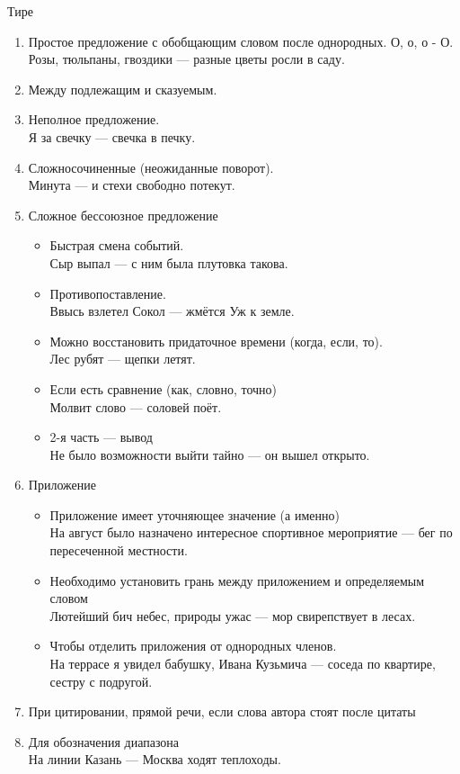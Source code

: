 \documentclass{article}
\begin{document}
Тире

\begin{enumerate}
\item
  Простое предложение с обобщающим словом после однородных. О, о, о - О.\\
  Розы, тюльпаны, гвоздики --- разные цветы росли в саду.
\item
  Между подлежащим и сказуемым.
\item
  Неполное предложение.\\
  Я за свечку --- свечка в печку.
\item
  Сложносочиненные (неожиданные поворот).\\
  Минута --- и стехи свободно потекут.
\item
  Сложное бессоюзное предложение
  \begin{itemize}
  \item
    Быстрая смена событий.\\
    Сыр выпал --- с ним была плутовка такова.
  \item
    Противопоставление.\\
    Ввысь взлетел Сокол --- жмётся Уж к земле.
  \item
    Можно восстановить придаточное времени (когда, если, то).\\
    Лес рубят --- щепки летят.
  \item
    Если есть сравнение (как, словно, точно)\\
    Молвит слово --- соловей поёт.
  \item
    2-я часть --- вывод\\
    Не было возможности выйти тайно --- он вышел открыто.
  \end{itemize}
\item
  Приложение
  \begin{itemize}
  \item
    Приложение имеет уточняющее значение (а именно)\\
    На август было назначено интересное спортивное мероприятие --- бег по пересеченной местности.
  \item
    Необходимо установить грань между приложением и определяемым словом\\
    Лютейший бич небес, природы ужас --- мор свирепствует в лесах.
  \item
    Чтобы отделить приложения от однородных членов.\\
    На террасе я увидел бабушку, Ивана Кузьмича --- соседа по квартире, сестру с подругой.
  \end{itemize}
\item
  При цитировании, прямой речи, если слова автора стоят после цитаты\\
\item
  Для обозначения диапазона\\
  На линии Казань --- Москва ходят теплоходы.
\end{enumerate}
\end{document}
